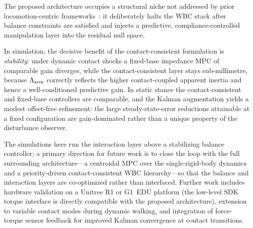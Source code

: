 The proposed architecture occupies a structural niche not addressed by prior
locomotion-centric frameworks~\cite{dicarlo2018dynamic,kim2019highly,bellicoso2016perception,koolen2016design}:
it deliberately halts the WBC stack after balance constraints are satisfied
and injects a predictive, compliance-controlled manipulation layer into the
residual null space.

In simulation, the decisive benefit of the contact-consistent formulation is
\emph{stability}: under dynamic contact shocks a fixed-base impedance MPC of
comparable gain diverges, while the contact-consistent layer stays
sub-millimetre, because $\Lambda_{\text{arm}}$ correctly reflects the higher contact-coupled
apparent inertia and hence a well-conditioned predictive gain. In static
stance the contact-consistent and fixed-base controllers are comparable, and
the Kalman augmentation yields a modest offset-free refinement: the large
steady-state-error reductions attainable at a fixed configuration are
gain-dominated rather than a unique property of the disturbance observer.

The simulations here run the interaction layer above a stabilizing balance
controller; a primary direction for future work is to close the loop with the
full surrounding architecture---a centroidal MPC over the single-rigid-body
dynamics and a priority-driven contact-consistent WBC hierarchy---so that the
balance and interaction layers are co-optimized rather than interfaced.
Further work includes hardware validation on a Unitree R1 or G1~EDU platform
(the low-level SDK torque interface is directly compatible with the proposed
architecture), extension to variable contact modes during dynamic walking,
and integration of force-torque sensor feedback for improved Kalman
convergence at contact transitions.



